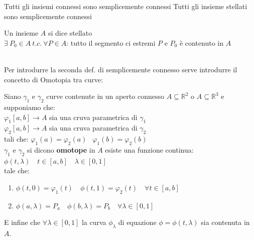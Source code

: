 \documentclass[a4paper, oneside]{article}
\newcommand{\tab}{\hspace*{2em}}
\begin{document}
Tutti gli insiemi connessi sono semplicemente connessi
Tutti gli insieme stellati sono semplicemente connessi
\begin{definition}
    Un insieme $A$ si dice stellato\\
     $\exists \ P_0 \in A \ t.c. \ \forall P \in A$: \tab tutto il segmento ci estremi $P$ e $P_0$ è contenuto in $A$
\end{definition}
\hfil\\
Per introdurre la seconda def. di semplicemente connesso serve introdurre il concetto di Omotopia tra curve:
\begin{definition}
    Siano $\gamma_1$ e $\gamma_2$ curve contenute in un aperto connesso $A \subseteq \mathbb{R}^2$ o $A \subseteq \mathbb{R}^3$ e supponiamo che:\\
    $\varphi_1[a,b] \to A$ \tab sia una cruva parametrica di $\gamma_1$\\
    $\varphi_2[a,b] \to A$ \tab sia una cruva parametrica di $\gamma_2$\\
    tali che: \tab $\varphi_1(a) = \varphi_2(a) \ $  $ \ \varphi_1(b) = \varphi_2(b)$\\
    $\gamma_1$ e $\gamma_2$ si dicono \textbf{omotope} in $A$  esiste una funzione continua: $\phi(t, \lambda) \quad t \in [a,b] \quad \lambda \in [0,1]$\\
    tale che:
    \begin{enumerate}
        \item $\phi(t, 0) = \varphi_1(t) \quad \phi(t,1) = \varphi_2(t) \quad \forall t \in [a,b]$
        \item $\phi(a, \lambda) = P_a \quad \phi(b , \lambda) = P_b \quad \forall \lambda \in [0,1]$
    \end{enumerate}
    E infine che $\forall \lambda \in [0,1]$ la curva $\phi_\lambda$ di equazione $\phi = \phi(t,\lambda)$ sia contenuta in $A$.
    \begin{center}
    \end{center}
\end{definition}
\end{document}
